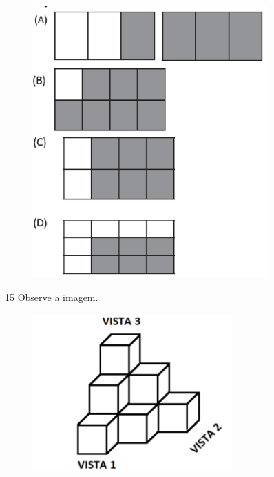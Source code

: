 \begin{figure}[H]
\includegraphics[width=3.57531in,height=4.10869in]{./imgSAEB_6_MAT/media/image111.png}
\end{figure}



\num{15} Observe a imagem.

\begin{figure}[H]
\centering\includegraphics[width=3.01693in,height=2.38354in]{./imgSAEB_6_MAT/media/image112.png}
\end{figure}

